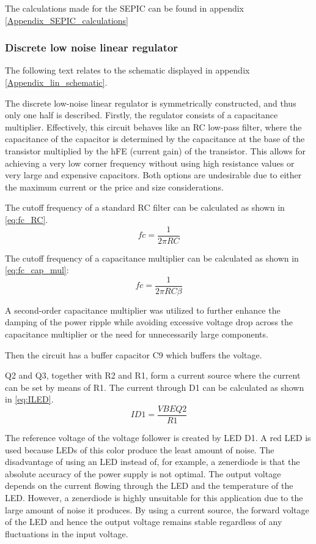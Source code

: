 The calculations made for the SEPIC can be found in appendix \ref{Appendix_SEPIC_calculations}

\subsubsection{Discrete low noise linear regulator}
The following text relates to the schematic displayed in appendix \ref{Appendix_lin_schematic}.

The discrete low-noise linear regulator is symmetrically constructed, and thus only one half is described. Firstly, the regulator consists of a capacitance multiplier. Effectively, this circuit behaves like an RC low-pass filter, where the capacitance of the capacitor is determined by the capacitance at the base of the transistor multiplied by the hFE (current gain) of the transistor. This allows for achieving a very low corner frequency without using high resistance values or very large and expensive capacitors. Both options are undesirable due to either the maximum current or the price and size considerations.

The cutoff frequency of a standard RC filter can be calculated as shown in \ref{eq:fc_RC}.
\begin{equation}
    fc=\frac{1}{2 \pi R C}
    \label{eq:fc_RC}
\end{equation}

The cutoff frequency of a capacitance multiplier can be calculated as shown in \ref{eq:fc_cap_mul}:
\begin{equation}
    fc=\frac{1}{2 \pi R C \beta}
    \label{eq:fc_cap_mul}
\end{equation}

A second-order capacitance multiplier was utilized to further enhance the damping of the power ripple while avoiding excessive voltage drop across the capacitance multiplier or the need for unnecessarily large components.

Then the circuit has a buffer capacitor C9 which buffers the voltage.

Q2 and Q3, together with R2 and R1, form a current source where the current can be set by means of R1. The current through D1 can be calculated as shown in \ref{eq:ILED}.
\begin{equation}
    ID1=\frac{VBEQ2}{R1}
    \label{eq:ILED}
\end{equation}

The reference voltage of the voltage follower is created by LED D1. A red LED is used because LEDs of this color produce the least amount of noise. The disadvantage of using an LED instead of, for example, a zenerdiode is that the absolute accuracy of the power supply is not optimal. The output voltage depends on the current flowing through the LED and the temperature of the LED. However, a zenerdiode is highly unsuitable for this application due to the large amount of noise it produces. By using a current source, the forward voltage of the LED and hence the output voltage remains stable regardless of any fluctuations in the input voltage.

